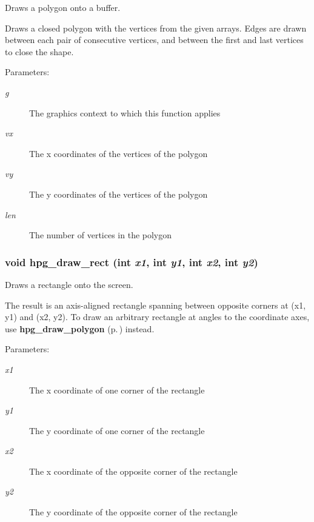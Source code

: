 Draws a polygon onto a buffer.

Draws a closed polygon with the vertices from the given arrays. Edges are drawn between each pair of consecutive vertices, and between the first and last vertices to close the shape.\begin{Desc}
\item[Parameters: ]\par
\begin{description}
\item[{\em 
g}]The graphics context to which this function applies \item[{\em 
vx}]The x coordinates of the vertices of the polygon \item[{\em 
vy}]The y coordinates of the vertices of the polygon \item[{\em 
len}]The number of vertices in the polygon \end{description}
\end{Desc}
\subsubsection{\setlength{\rightskip}{0pt plus 5cm}void hpg\_\-draw\_\-rect (int {\em x1}, int {\em y1}, int {\em x2}, int {\em y2})}\label{hpgraphics_8h_a45}


Draws a rectangle onto the screen.

The result is an axis-aligned rectangle spanning between opposite corners at (x1, y1) and (x2, y2). To draw an arbitrary rectangle at angles to the coordinate axes, use {\bf hpg\_\-draw\_\-polygon} {\rm (p.\,\pageref{hpgraphics_8h_a53})} instead.\begin{Desc}
\item[Parameters: ]\par
\begin{description}
\item[{\em 
x1}]The x coordinate of one corner of the rectangle \item[{\em 
y1}]The y coordinate of one corner of the rectangle \item[{\em 
x2}]The x coordinate of the opposite corner of the rectangle \item[{\em 
y2}]The y coordinate of the opposite corner of the rectangle \end{description}
\end{Desc}
